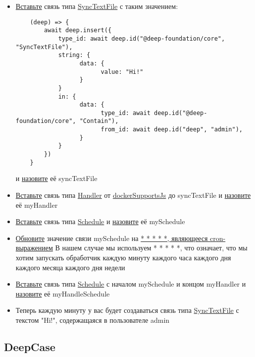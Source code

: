 \documentclass{article}
\begin{document}
\begin{itemize}
  \item \hyperlink{DeepCase.InsertLink.Description}{Вставьте} связь типа
        \hyperlink{Core.SyncTextFile.Description}{SyncTextFile} с таким
        значением:
        \begin{lstlisting}
    (deep) => {
        await deep.insert({
            type_id: await deep.id("@deep-foundation/core", "SyncTextFile"),
            string: {
                  data: {
                        value: "Hi!"
                  }
            }
            in: {
                  data: {
                        type_id: await deep.id("@deep-foundation/core", "Contain"),
                        from_id: await deep.id("deep", "admin"),
                  }
            }
        })
    }
    \end{lstlisting}
        и \hyperlink{FAQ.HowToSetName}{назовите} её syncTextFile
  \item \hyperlink{DeepCase.InsertLink.Description}{Вставьте} связь типа
        \hyperlink{Core.Handler.Description}{Handler} от
        \hyperlink{Core.dockerSupportsJs.Description}{dockerSupportsJs}
        до syncTextFile и \hyperlink{FAQ.HowToSetName}{назовите} её
        myHandler
  \item \hyperlink{DeepCase.InsertLink.Description}{Вставьте} связь
        типа \hyperlink{Core.Schedule.Description}{Schedule} и
        \hyperlink{FAQ.HowToSetName}{назовите} её mySchedule
  \item \hyperlink{DeepCase.UpdateLink.Description}{Обновите}
        значение связи mySchedule на
        \hyperlink{Handler.Schedule.CronExpression.Description}{* * * * *,
          являющееся
          cron-выражением}
        В нашем случае мы используем * * * * *, что означает, что мы хотим
        запускать обработчик каждую минуту каждого часа каждого дня каждого
        месяца
        каждого дня недели
  \item \hyperlink{DeepCase.InsertLink.Description}{Вставьте} связь
        типа \hyperlink{Core.HandleSchedule.Description}{Schedule} с
        началом mySchedule
        и концом myHandler	и \hyperlink{FAQ.HowToSetName}{назовите} её
        myHandleSchedule
  \item Теперь каждую минуту у вас будет создаваться связь типа
        \hyperlink{Core.SyncTextFile.Description}{SyncTextFile} с текстом
        "Hi!",
        содержащаяся в пользователе admin
\end{itemize}
\subsection{DeepCase}
\end{document}
